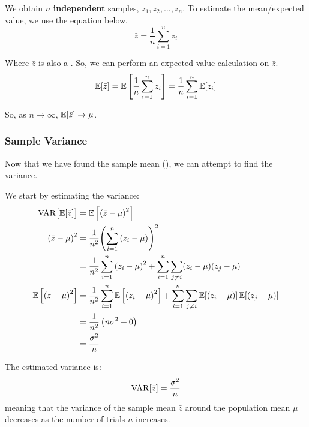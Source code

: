 We obtain $n$ \textbf{independent} samples, $z_{1}, z_{2}, \ldots, z_{n}$.
To estimate the mean/expected value, we use the equation below.
\begin{equation}\label{eq:Sample_Mean}
  \bar{z} = \frac{1}{n} \sum\limits_{i=1}^{n}z_{i}
\end{equation}

Where $\bar{z}$ is also a .
So, we can perform an expected value calculation on $\bar{z}$.
\begin{equation}\label{eq:Sample_Expected_Value}
  \operatorname{\operatorname{\mathbb{E}}}[\bar{z}] = \operatorname{\operatorname{\mathbb{E}}} \left[ \frac{1}{n} \sum\limits_{i=1}^{n} z_{i} \right] = \frac{1}{n} \sum\limits_{i=1}^{n} \operatorname{\operatorname{\mathbb{E}}}[z_{i}]
\end{equation}

So, as $n \rightarrow \infty$, $\operatorname{\operatorname{\mathbb{E}}}[\bar{z}] \rightarrow \mu$.

\subsubsection{Sample Variance}\label{subsubsec:sample_Variance}
Now that we have found the sample mean (), we can attempt to find the variance.

We start by estimating the variance:
\begin{align*}
  \operatorname{\operatorname{VAR}} \bigl[ \operatorname{\operatorname{\mathbb{E}}}[\bar{z}] \bigr] &= \operatorname{\operatorname{\mathbb{E}}} \left[ {(\bar{z} - \mu)}^{2} \right] \\
  {(\bar{z} - \mu)}^{2} &= \frac{1}{n^{2}} {\left( \sum\limits_{i=1}^{n} \left(z_{i} - \mu \right) \right)}^{2} \\
                                                  &= \frac{1}{n^{2}} \sum\limits_{i=1}^{n} {(z_{i} - \mu)}^{2} + \sum\limits_{i=1}^{n}\sum\limits_{j \neq i} (z_{i} - \mu) (z_{j} - \mu) \\
  \operatorname{\operatorname{\mathbb{E}}} \left[ {(\bar{z} - \mu)}^{2} \right] &= \frac{1}{n^{2}} \sum\limits_{i=1}^{n} \operatorname{\operatorname{\mathbb{E}}} \left[ {(z_{i} - \mu)}^{2} \right] + \sum\limits_{i=1}^{n}\sum\limits_{j \neq i} \operatorname{\operatorname{\mathbb{E}}}[(z_{i}-\mu)] \operatorname{\operatorname{\mathbb{E}}}[(z_{j} - \mu)] \\
                                                  &= \frac{1}{n^{2}} \left( n \sigma^{2} + 0 \right) \\
                                                  &= \frac{\sigma^{2}}{n}
\end{align*}

The estimated variance is:
\begin{equation*}
  \operatorname{\operatorname{VAR}}[\bar{z}] = \frac{\sigma^{2}}{n}
\end{equation*}
meaning that the variance of the sample mean $\bar{z}$ around the population mean $\mu$ decreases as the number of trials $n$ increases.

